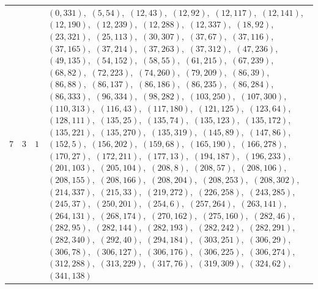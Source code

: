 \documentclass[11pt]{article}
\begin{document}
\begin{longtable}{@{}rrl>{\raggedright\arraybackslash}p{}@{}}
7 & 3 & $1$ & $(0,331)$,\allowbreak\ $(5,54)$,\allowbreak\ $(12,43)$,\allowbreak\ $(12,92)$,\allowbreak\ $(12,117)$,\allowbreak\ $(12,141)$,\allowbreak\ $(12,190)$,\allowbreak\ $(12,239)$,\allowbreak\ $(12,288)$,\allowbreak\ $(12,337)$,\allowbreak\ $(18,92)$,\allowbreak\ $(23,321)$,\allowbreak\ $(25,113)$,\allowbreak\ $(30,307)$,\allowbreak\ $(37,67)$,\allowbreak\ $(37,116)$,\allowbreak\ $(37,165)$,\allowbreak\ $(37,214)$,\allowbreak\ $(37,263)$,\allowbreak\ $(37,312)$,\allowbreak\ $(47,236)$,\allowbreak\ $(49,135)$,\allowbreak\ $(54,152)$,\allowbreak\ $(58,55)$,\allowbreak\ $(61,215)$,\allowbreak\ $(67,239)$,\allowbreak\ $(68,82)$,\allowbreak\ $(72,223)$,\allowbreak\ $(74,260)$,\allowbreak\ $(79,209)$,\allowbreak\ $(86,39)$,\allowbreak\ $(86,88)$,\allowbreak\ $(86,137)$,\allowbreak\ $(86,186)$,\allowbreak\ $(86,235)$,\allowbreak\ $(86,284)$,\allowbreak\ $(86,333)$,\allowbreak\ $(96,334)$,\allowbreak\ $(98,282)$,\allowbreak\ $(103,250)$,\allowbreak\ $(107,300)$,\allowbreak\ $(110,313)$,\allowbreak\ $(116,43)$,\allowbreak\ $(117,180)$,\allowbreak\ $(121,125)$,\allowbreak\ $(123,64)$,\allowbreak\ $(128,111)$,\allowbreak\ $(135,25)$,\allowbreak\ $(135,74)$,\allowbreak\ $(135,123)$,\allowbreak\ $(135,172)$,\allowbreak\ $(135,221)$,\allowbreak\ $(135,270)$,\allowbreak\ $(135,319)$,\allowbreak\ $(145,89)$,\allowbreak\ $(147,86)$,\allowbreak\ $(152,5)$,\allowbreak\ $(156,202)$,\allowbreak\ $(159,68)$,\allowbreak\ $(165,190)$,\allowbreak\ $(166,278)$,\allowbreak\ $(170,27)$,\allowbreak\ $(172,211)$,\allowbreak\ $(177,13)$,\allowbreak\ $(194,187)$,\allowbreak\ $(196,233)$,\allowbreak\ $(201,103)$,\allowbreak\ $(205,104)$,\allowbreak\ $(208,8)$,\allowbreak\ $(208,57)$,\allowbreak\ $(208,106)$,\allowbreak\ $(208,155)$,\allowbreak\ $(208,166)$,\allowbreak\ $(208,204)$,\allowbreak\ $(208,253)$,\allowbreak\ $(208,302)$,\allowbreak\ $(214,337)$,\allowbreak\ $(215,33)$,\allowbreak\ $(219,272)$,\allowbreak\ $(226,258)$,\allowbreak\ $(243,285)$,\allowbreak\ $(245,37)$,\allowbreak\ $(250,201)$,\allowbreak\ $(254,6)$,\allowbreak\ $(257,264)$,\allowbreak\ $(263,141)$,\allowbreak\ $(264,131)$,\allowbreak\ $(268,174)$,\allowbreak\ $(270,162)$,\allowbreak\ $(275,160)$,\allowbreak\ $(282,46)$,\allowbreak\ $(282,95)$,\allowbreak\ $(282,144)$,\allowbreak\ $(282,193)$,\allowbreak\ $(282,242)$,\allowbreak\ $(282,291)$,\allowbreak\ $(282,340)$,\allowbreak\ $(292,40)$,\allowbreak\ $(294,184)$,\allowbreak\ $(303,251)$,\allowbreak\ $(306,29)$,\allowbreak\ $(306,78)$,\allowbreak\ $(306,127)$,\allowbreak\ $(306,176)$,\allowbreak\ $(306,225)$,\allowbreak\ $(306,274)$,\allowbreak\ $(312,288)$,\allowbreak\ $(313,229)$,\allowbreak\ $(317,76)$,\allowbreak\ $(319,309)$,\allowbreak\ $(324,62)$,\allowbreak\ $(341,138)$\\

\end{longtable}
\end{document}
